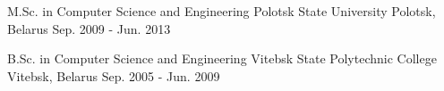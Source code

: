 

\begin{cventries}

    \cventry
    {M.Sc. in Computer Science and Engineering} %
    {Polotsk State University} %
    {Polotsk, Belarus} %
    {Sep. 2009 - Jun. 2013} %
    {
    }

    \cventry
    {B.Sc. in Computer Science and Engineering} %
    {Vitebsk State Polytechnic College} %
    {Vitebsk, Belarus} %
    {Sep. 2005 - Jun. 2009} %
    {
    }

\end{cventries}
